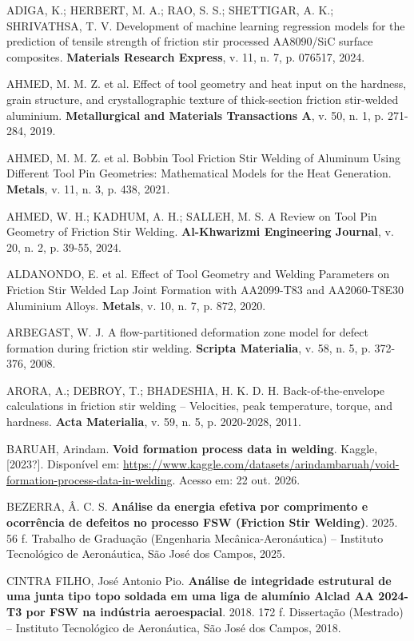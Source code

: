 \documentclass[12pt,openany]{report}
\begin{document}
\begin{singlespace}
\raggedright
\setlength{\parindent}{0pt}
\setlength{\parskip}{\baselineskip}
ADIGA, K.; HERBERT, M. A.; RAO, S. S.; SHETTIGAR, A. K.; SHRIVATHSA, T. V. Development of machine learning regression models for the prediction of tensile strength of friction stir processed AA8090/SiC surface composites. \textbf{Materials Research Express}, v. 11, n. 7, p. 076517, 2024.

AHMED, M. M. Z. et al. Effect of tool geometry and heat input on the hardness, grain structure, and crystallographic texture of thick-section friction stir-welded aluminium. \textbf{Metallurgical and Materials Transactions A}, v. 50, n. 1, p. 271-284, 2019.

AHMED, M. M. Z. et al. Bobbin Tool Friction Stir Welding of Aluminum Using Different Tool Pin Geometries: Mathematical Models for the Heat Generation. \textbf{Metals}, v. 11, n. 3, p. 438, 2021.

AHMED, W. H.; KADHUM, A. H.; SALLEH, M. S. A Review on Tool Pin Geometry of Friction Stir Welding. \textbf{Al-Khwarizmi Engineering Journal}, v. 20, n. 2, p. 39-55, 2024.

ALDANONDO, E. et al. Effect of Tool Geometry and Welding Parameters on Friction Stir Welded Lap Joint Formation with AA2099-T83 and AA2060-T8E30 Aluminium Alloys. \textbf{Metals}, v. 10, n. 7, p. 872, 2020.

ARBEGAST, W. J. A flow-partitioned deformation zone model for defect formation during friction stir welding. \textbf{Scripta Materialia}, v. 58, n. 5, p. 372-376, 2008.

ARORA, A.; DEBROY, T.; BHADESHIA, H. K. D. H. Back-of-the-envelope calculations in friction stir welding -- Velocities, peak temperature, torque, and hardness. \textbf{Acta Materialia}, v. 59, n. 5, p. 2020-2028, 2011.

BARUAH, Arindam. \textbf{Void formation process data in welding}. Kaggle, [2023?]. Disponível em: \url{https://www.kaggle.com/datasets/arindambaruah/void-formation-process-data-in-welding}. Acesso em: 22 out. 2026.

BEZERRA, Â. C. S. \textbf{Análise da energia efetiva por comprimento e ocorrência de defeitos no processo FSW (Friction Stir Welding)}. 2025. 56 f. Trabalho de Graduação (Engenharia Mecânica-Aeronáutica) -- Instituto Tecnológico de Aeronáutica, São José dos Campos, 2025.

CINTRA FILHO, José Antonio Pio. \textbf{Análise de integridade estrutural de uma junta tipo topo soldada em uma liga de alumínio Alclad AA 2024-T3 por FSW na indústria aeroespacial}. 2018. 172 f. Dissertação (Mestrado) -- Instituto Tecnológico de Aeronáutica, São José dos Campos, 2018.


\end{singlespace}
\end{document}
